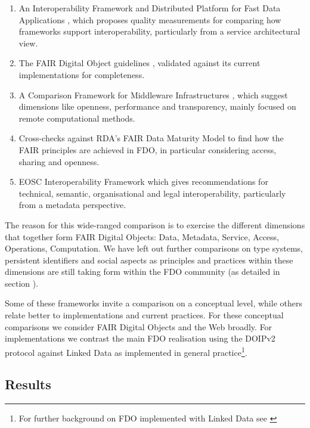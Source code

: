 \begin{enumerate}
\tightlist
\item
  An Interoperability Framework and Distributed Platform for Fast Data Applications \cite{delgadoInteroperabilityFrameworkDistributed2016a}, which proposes quality measurements for comparing how frameworks support interoperability, particularly from a service architectural view.
\item
  The FAIR Digital Object guidelines \cite{bonino2019}, validated against its current implementations for completeness.
\item
  A Comparison Framework for Middleware Infrastructures \cite{zarrasComparisonFrameworkMiddleware2004a}, which suggest dimensions like openness, performance and transparency, mainly focused on remote computational methods.
\item
  Cross-checks against RDA's FAIR Data Maturity Model \cite{bahimFAIRDataMaturity2020a} to find how the FAIR principles are achieved in FDO, in particular considering access, sharing and openness.
\item
  EOSC Interoperability Framework \cite{eosc-interop-framework} which gives recommendations for technical, semantic, organisational and legal interoperability, particularly from a metadata perspective.
\end{enumerate}

The reason for this wide-ranged comparison is to exercise the different dimensions that together form FAIR Digital Objects: Data, Metadata, Service, Access, Operations, Computation.
We have left out further comparisons on type systems, persistent identifiers and social aspects as principles and practices within these dimensions are still taking form within the FDO community (as detailed in section ).

Some of these frameworks invite a comparison on a conceptual level, while others relate better to implementations and current practices. For these conceptual comparisons we consider FAIR Digital Objects and the Web broadly. For implementations we contrast the main FDO realisation using the DOIPv2 protocol \cite{DONA 2018} against Linked Data as implemented in general practice\footnote{For further background on FDO implemented with Linked Data see \cite{bonino2021,10.3897/rio.8.e94501}}.

\subsection{Results}

